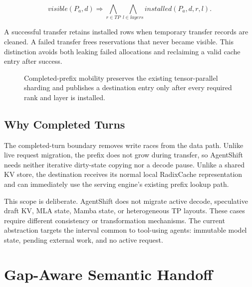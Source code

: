 \[
visible(P_a,d) \Rightarrow \bigwedge_{r \in TP}\bigwedge_{l \in layers} installed(P_a,d,r,l).
\]

A successful transfer retains installed rows when temporary transfer records are cleaned. A failed transfer frees reservations that never became visible. This distinction avoids both leaking failed allocations and reclaiming a valid cache entry after success.

\begin{figure}[t]
  \centering
  \caption{Completed-prefix mobility preserves the existing tensor-parallel sharding and publishes a destination entry only after every required rank and layer is installed.}
  \label{fig:prefix-mobility}
\end{figure}

\subsection{Why Completed Turns}\label{why-completed-turns}

The completed-turn boundary removes write races from the data path. Unlike live request migration, the prefix does not grow during transfer, so AgentShift needs neither iterative dirty-state copying nor a decode pause. Unlike a shared KV store, the destination receives its normal local RadixCache representation and can immediately use the serving engine's existing prefix lookup path.

This scope is deliberate. AgentShift does not migrate active decode, speculative draft KV, MLA state, Mamba state, or heterogeneous TP layouts. These cases require different consistency or transformation mechanisms. The current abstraction targets the interval common to tool-using agents: immutable model state, pending external work, and no active request.

\section{Gap-Aware Semantic Handoff}\label{gap-aware-semantic-handoff}

